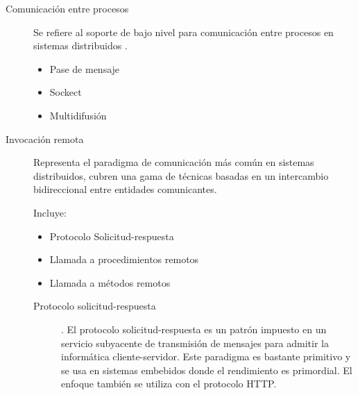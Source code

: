 \begin{description}
	\item[Comunicación entre procesos] Se refiere al soporte de bajo nivel  para comunicación entre procesos en sistemas distribuidos .  
	  
	
		  
	
		\begin{tcolorbox}
		[colback=green!5!white,colframe=green!75!black,fonttitle=\bfseries,title=Comunicación entre procesos ]
			\begin{itemize}
			\item Pase de mensaje
			\item Sockect
			\item Multidifusi\'on
			\end{itemize} 	
	\end{tcolorbox}
	
	
		
	\item[Invocación remota] Representa el paradigma de comunicación más común en sistemas distribuidos, cubren una gama de técnicas basadas en un intercambio bidireccional entre entidades comunicantes. 
	
		    	 
	
		\begin{tcolorbox}
		[colback=red!5!white,colframe=red!75!black,fonttitle=\bfseries,title=Invocación remota]
		Incluye:
		\begin{itemize}
			\item Protocolo Solicitud-respuesta  	
			\item Llamada a procedimientos remotos  	
			\item Llamada a m\'etodos remotos
		\end{itemize} 		
	\end{tcolorbox}
	
	
	

	\begin{description}
		
		\item[Protocolo solicitud-respuesta].   El \gls{protocolo solicitud-respuesta} es un patrón impuesto en un servicio subyacente de transmisión de mensajes para admitir la informática cliente-servidor.  Este paradigma es bastante primitivo y  se usa  en sistemas embebidos donde el rendimiento es primordial. El  enfoque también se utiliza con el protocolo HTTP. 
		

\end{description}
\end{description}
